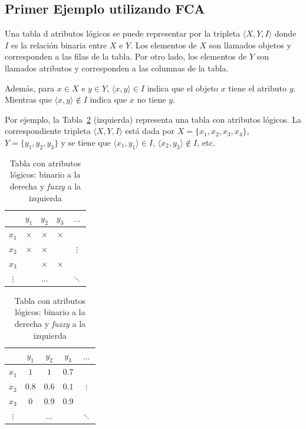 \documentclass[12pt,oneside,letterpaper]{book}
\newcommand{\eng}[1]{\textit{#1}\xspace}			%
\newcommand{\abr}[1]{\textsc{#1}\xspace}           %
\theoremstyle{definition}
\begin{document}
\subsection{Primer Ejemplo utilizando \abr{FCA}} %
\label{sub:primer_ejemplo}
Una tabla d atributos lógicos se puede representar por la tripleta $\langle X,Y,I \rangle$ donde $I$ es la relación binaria entre $X$ e $Y$. Los elementos de $X$ son llamados objetos y corresponden a las filas de la tabla. Por otro lado, los elementos de $Y$ son llamados atributos y corresponden a las columnas de la tabla.

Además, para $x \in X$ e $y \in Y$, $\langle x,y\rangle \in I$ indica que el objeto $x$ tiene el atributo $y$. Mientras que $\langle x,y \rangle \notin I$ indica que $x$ no tiene $y$.

\clearpage
Por ejemplo, la Tabla~\ref{tbl:table_logical_attributes} (izquierda) representa una tabla con atributos lógicos. La correspondiente tripleta $\langle X,Y,I \rangle$ está dada por $X = \{x_1,x_2,x_3, x_4\}$, $Y = \{y_1,y_2,y_3\}$ y se tiene que $\langle x_1,y_1 \rangle \in I$, $\langle x_2,y_3 \rangle \notin I$, etc.
\begin{table}[h!]
	\centering
	\begin{minipage}[b]{0.49\textwidth}
		\begin{tabular}{|c|cccc|}
			\hline
				  & $y_1$	 & $y_2$ 	& $y_3$	   & $\dots$ \\
			\hline
			$x_1$ & $\times$ & $\times$ & $\times$ & 		  \\
			$x_2$ & $\times$ & $\times$ & 		   & $\vdots$ \\
			$x_3$ & 		 & $\times$ & $\times$ & 		  \\
			$\vdots$ & 		 & $\dots$	& 		   & $\ddots$ \\
			\hline		 	
		\end{tabular}
	\end{minipage}
	\begin{minipage}[b]{0.49\textwidth}
		\begin{tabular}{|c|cccc|}
			\hline
					 & $y_1$ & $y_2$   	& $y_3$ & $\dots$	\\
			\hline
			$x_1$	 & $1$ 	 & $1$	 	& $0.7$ & 			\\
			$x_2$	 & $0.8$ & $0.6$ 	& $0.1$ & $\vdots$	\\
			$x_3$	 & $0$	 & $0.9$ 	& $0.9$ & 			\\
			$\vdots$ & 		 & $\dots$	& 		& $\ddots$ 	\\
			\hline		 	
		\end{tabular}
	\end{minipage}
	\caption{Tabla con atributos lógicos: binario a la derecha y \eng{fuzzy} a la izquierda}
	\label{tbl:table_logical_attributes}
\end{table}
\end{document}
